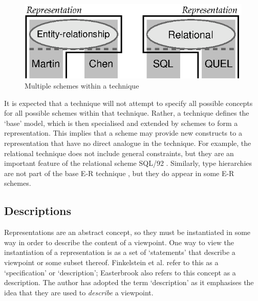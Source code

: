 \documentclass[11pt,oribibl]{llncs}
\begin{document}

\begin{figure}[htbp]
	\centering
	\includegraphics{MultipleSchemes}
	\caption{Multiple schemes within a technique}
	\label{Fig.MultipleRepresentations.MultipleSchemes}
\end{figure}


It is expected that a technique will not attempt to specify all possible concepts for all possible schemes within that technique. Rather, a technique defines the `base' model, which is then specialised and extended by schemes to form a representation. This implies that a scheme may provide new constructs to a representation that have no direct analogue in the technique. For example, the relational technique \cite{Codd:EF:1970} does not include general constraints, but they are an important feature of the relational scheme SQL/92 \cite{Date:CJ:1997:SQL}. Similarly, type hierarchies are not part of the base E-R technique \cite{Chen:PP:1976}, but they do appear in some E-R schemes.


\subsection{Descriptions}
\label{Sec:MultipleRepresentations:Representations:Descriptions}

Representations are an abstract concept, so they must be instantiated in some way in order to describe the content of a viewpoint. One way to view the instantiation of a representation is as a set of `statements' that describe a viewpoint or some subset thereof. Finkelstein et al. \cite{Fink:ACW:1989} refer to this as a `specification' or `description'; Easterbrook \cite{East:SM:1991:PhD} also refers to this concept as a description. The author has adopted the term `description' as it emphasises the idea that they are used to \emph{describe} a viewpoint.
\end{document}
